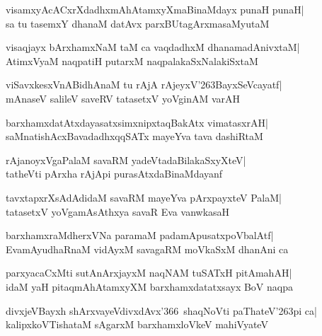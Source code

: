 \documentclass[twoside,12pt,openright]{book}
\def\S{\char'263}
\newcounter{shloka}[chapter]
\begin{document}
\begin{shloka}%
visamxyAcACxrXdadhxmAhAtamxyXmaBinaMdayx punaH punaH|\\
sa tu tasemxY dhanaM datAvx parxBUtagArxmasaMyutaM
\end{shloka}

\begin{shloka}%
visaqjayx bArxhamxNaM taM ca vaqdadhxM dhanamadAnivxtaM|\\
AtimxVyaM naqpatiH putarxM naqpalakaSxNalakiSxtaM
\end{shloka}

\begin{shloka}%
viSavxkesxVnABidhAnaM tu rAjA rAjeyxV\S BayxSeVcayatf|\\
mAnaseV salileV saveRV tatasetxV yoVginAM varAH
\end{shloka}

\begin{shloka}%
barxhamxdatAtxdayasatxsimxnipxtaqBakAtx vimatasxrAH|\\
saMnatishAcxBavadadhxqqSATx mayeYva tava dashiRtaM
\end{shloka}

\begin{shloka}%
rAjanoyxVgaPalaM savaRM yadeVtadaBilakaSxyXteV|\\
tatheVti pArxha rAjApi purasAtxdaBinaMdayanf
\end{shloka}

\begin{shloka}%
tavxtapxrXsAdAdidaM savaRM mayeYva pArxpayxteV PalaM|\\
tatasetxV yoVgamAsAthxya savaR Eva vanwkasaH
\end{shloka}

\begin{shloka}%
barxhamxraMdherxVNa paramaM padamApusatxpoVbalAtf|\\
EvamAyudhaRnaM vidAyxM savagaRM moVkaSxM dhanAni ca 
\end{shloka}

\begin{shloka}%
parxyacaCxMti sutAnArxjayxM naqNAM tuSATxH pitAmahAH|\\
idaM yaH pitaqmAhAtamxyXM barxhamxdatatxsayx BoV naqpa
\end{shloka}

\begin{shloka}%
divxjeVBayxh shArxvayeVdivxdAvx\char'366\ shaqNoVti paThateV\S pi
ca|\\
kalipxkoVTishataM sAgarxM barxhamxloVkeV mahiVyateV
\end{shloka}
\end{document}
